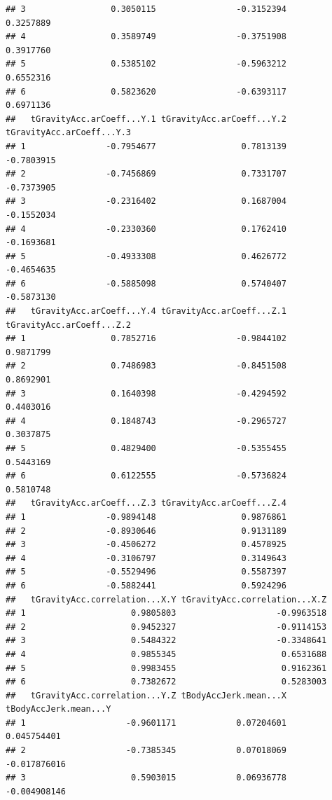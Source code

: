 \documentclass[
]{article}
\begin{document}
\begin{verbatim}
## 3                 0.3050115                -0.3152394                 0.3257889
## 4                 0.3589749                -0.3751908                 0.3917760
## 5                 0.5385102                -0.5963212                 0.6552316
## 6                 0.5823620                -0.6393117                 0.6971136
##   tGravityAcc.arCoeff...Y.1 tGravityAcc.arCoeff...Y.2 tGravityAcc.arCoeff...Y.3
## 1                -0.7954677                 0.7813139                -0.7803915
## 2                -0.7456869                 0.7331707                -0.7373905
## 3                -0.2316402                 0.1687004                -0.1552034
## 4                -0.2330360                 0.1762410                -0.1693681
## 5                -0.4933308                 0.4626772                -0.4654635
## 6                -0.5885098                 0.5740407                -0.5873130
##   tGravityAcc.arCoeff...Y.4 tGravityAcc.arCoeff...Z.1 tGravityAcc.arCoeff...Z.2
## 1                 0.7852716                -0.9844102                 0.9871799
## 2                 0.7486983                -0.8451508                 0.8692901
## 3                 0.1640398                -0.4294592                 0.4403016
## 4                 0.1848743                -0.2965727                 0.3037875
## 5                 0.4829400                -0.5355455                 0.5443169
## 6                 0.6122555                -0.5736824                 0.5810748
##   tGravityAcc.arCoeff...Z.3 tGravityAcc.arCoeff...Z.4
## 1                -0.9894148                 0.9876861
## 2                -0.8930646                 0.9131189
## 3                -0.4506272                 0.4578925
## 4                -0.3106797                 0.3149643
## 5                -0.5529496                 0.5587397
## 6                -0.5882441                 0.5924296
##   tGravityAcc.correlation...X.Y tGravityAcc.correlation...X.Z
## 1                     0.9805803                    -0.9963518
## 2                     0.9452327                    -0.9114153
## 3                     0.5484322                    -0.3348641
## 4                     0.9855345                     0.6531688
## 5                     0.9983455                     0.9162361
## 6                     0.7382672                     0.5283003
##   tGravityAcc.correlation...Y.Z tBodyAccJerk.mean...X tBodyAccJerk.mean...Y
## 1                    -0.9601171            0.07204601           0.045754401
## 2                    -0.7385345            0.07018069          -0.017876016
## 3                     0.5903015            0.06936778          -0.004908146

\end{verbatim}
\end{document}
